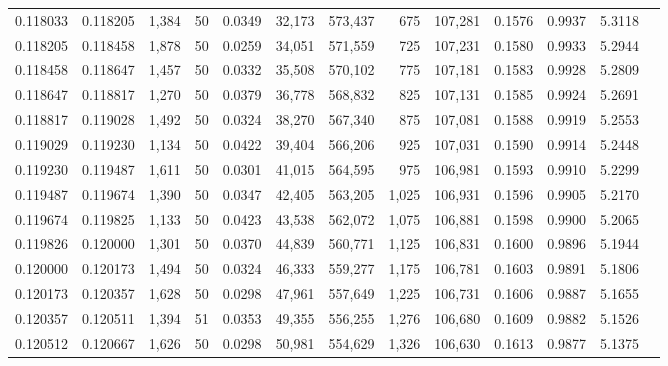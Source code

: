 \begin{tabular}{rrrrrrrrrrrrr}
0.118033 & 0.118205 & 1,384 &  50 &                                     0.0349 &  32,173 & 573,437 &     675 & 107,281 & 0.1576 & 0.9937 & 5.3118 \\
0.118205 & 0.118458 & 1,878 &  50 &                                     0.0259 &  34,051 & 571,559 &     725 & 107,231 & 0.1580 & 0.9933 & 5.2944 \\
0.118458 & 0.118647 & 1,457 &  50 &                                     0.0332 &  35,508 & 570,102 &     775 & 107,181 & 0.1583 & 0.9928 & 5.2809 \\
0.118647 & 0.118817 & 1,270 &  50 &                                     0.0379 &  36,778 & 568,832 &     825 & 107,131 & 0.1585 & 0.9924 & 5.2691 \\
0.118817 & 0.119028 & 1,492 &  50 &                                     0.0324 &  38,270 & 567,340 &     875 & 107,081 & 0.1588 & 0.9919 & 5.2553 \\
0.119029 & 0.119230 & 1,134 &  50 &                                     0.0422 &  39,404 & 566,206 &     925 & 107,031 & 0.1590 & 0.9914 & 5.2448 \\
0.119230 & 0.119487 & 1,611 &  50 &                                     0.0301 &  41,015 & 564,595 &     975 & 106,981 & 0.1593 & 0.9910 & 5.2299 \\
0.119487 & 0.119674 & 1,390 &  50 &                                     0.0347 &  42,405 & 563,205 &   1,025 & 106,931 & 0.1596 & 0.9905 & 5.2170 \\
0.119674 & 0.119825 & 1,133 &  50 &                                     0.0423 &  43,538 & 562,072 &   1,075 & 106,881 & 0.1598 & 0.9900 & 5.2065 \\
0.119826 & 0.120000 & 1,301 &  50 &                                     0.0370 &  44,839 & 560,771 &   1,125 & 106,831 & 0.1600 & 0.9896 & 5.1944 \\
0.120000 & 0.120173 & 1,494 &  50 &                                     0.0324 &  46,333 & 559,277 &   1,175 & 106,781 & 0.1603 & 0.9891 & 5.1806 \\
0.120173 & 0.120357 & 1,628 &  50 &                                     0.0298 &  47,961 & 557,649 &   1,225 & 106,731 & 0.1606 & 0.9887 & 5.1655 \\
0.120357 & 0.120511 & 1,394 &  51 &                                     0.0353 &  49,355 & 556,255 &   1,276 & 106,680 & 0.1609 & 0.9882 & 5.1526 \\
0.120512 & 0.120667 & 1,626 &  50 &                                     0.0298 &  50,981 & 554,629 &   1,326 & 106,630 & 0.1613 & 0.9877 & 5.1375 \\

\end{tabular}
